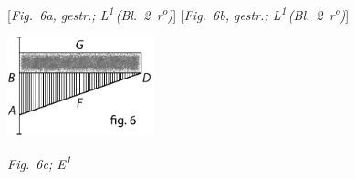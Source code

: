 \\
\\
\hspace*{9mm} [\textit{Fig.~6a, gestr.; L\textsuperscript{1}\,(Bl.~2~r\textsuperscript{o}\!)}]\hspace*{24mm} [\textit{Fig.~6b, gestr.; L\textsuperscript{1}\,(Bl.~2~r\textsuperscript{o}\!)}]
\pend
\vspace{1em}
\vspace{1.0em}%
  \centerline{\includegraphics[width=0.32\textwidth]{gesamttex/edit_VIII,3/images/dnr-6c_AE_1684_319-325_d6c.pdf}}%
  \vspace*{0.05em}
  \centerline{\lbrack\textit{Fig.~6c; E\textsuperscript{1}}\rbrack}%
  \label{AE_1684_324_Fig.6} 
\vspace{1.5em} 
\count{}
\count{}
\count{}
\newpage%
%
%
